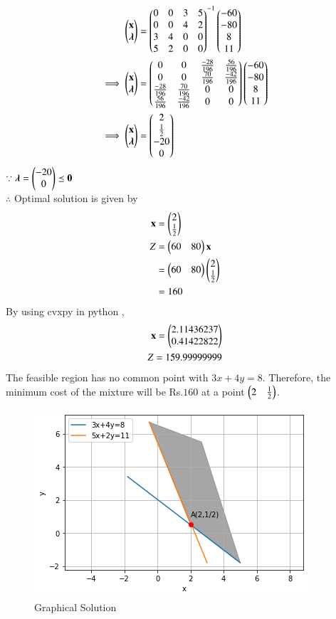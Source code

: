 \documentclass[journal,12pt,twocolumn]{IEEEtran}
\begin{document}
\begin{align}
    \begin{pmatrix}\mathbf{x} \\ \boldsymbol{\lambda}\end{pmatrix} &= \begin{pmatrix}0 & 0 & 3 & 5 \\ 0 & 0 & 4 & 2 \\ 3 & 4 & 0 & 0 \\ 5 & 2 & 0 & 0\end{pmatrix}^{-1}\begin{pmatrix}-60 \\-80 \\ 8 \\ 11\end{pmatrix}
    \\
    \implies   \begin{pmatrix}\mathbf{x} \\ \boldsymbol{\lambda}\end{pmatrix} &= \begin{pmatrix}0 & 0 & \frac{-28}{196} & \frac{56}{196} \\ 0 & 0 & \frac{70}{196} & \frac{-42}{196} \\ \frac{-28}{196} & \frac{70}{196} & 0 & 0 \\ \frac{56}{196} & \frac{-42}{196} & 0 & 0\end{pmatrix}\begin{pmatrix}-60 \\-80 \\ 8 \\ 11\end{pmatrix}
    \\
    \implies \begin{pmatrix}\mathbf{x} \\ \boldsymbol{\lambda}\end{pmatrix} &= \begin{pmatrix}2 \\ \frac{1}{2} \\ -20 \\ 0 \end{pmatrix}
\end{align}
$\because \boldsymbol{\lambda}=\begin{pmatrix}-20 \\ 0\end{pmatrix} \preceq \mathbf{0} $
\\
$\therefore$ Optimal solution is given by
\begin{align}
    \mathbf{x} &= \begin{pmatrix}2\\ \frac{1}{2}\end{pmatrix} \\
    Z &= \begin{pmatrix}60 & 80\end{pmatrix}\mathbf{x} \\
    &= \begin{pmatrix}60 & 80\end{pmatrix}\begin{pmatrix}2 \\ \frac{1}{2}\end{pmatrix} \\
    &= 160
\end{align}
By using cvxpy in python ,
\begin{align}
    \mathbf{x}=\begin{pmatrix}2.11436237\\0.41422822\end{pmatrix}\\
    Z = 159.99999999
\end{align}
The feasible region has no common point with $3x+4y=8$. Therefore, the minimum cost of the mixture will be Rs.$160$ at a point $\begin{pmatrix}2 & \frac{1}{2}\end{pmatrix}$.
\begin{figure}[!ht]
\centering
\includegraphics[width=\columnwidth]{Graphical Solution_10.png}
\caption{Graphical Solution}
\label{fig:Graphical Solution}	
\end{figure}
\end{document}

